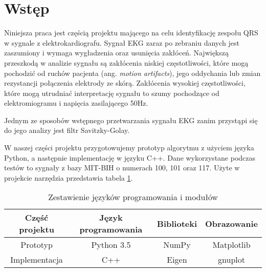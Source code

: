 \section{Wstęp}

Niniejsza praca jest częścią projektu mającego na celu identyfikację zespołu QRS w sygnale z elektrokardiografu. Sygnał EKG zaraz po zebraniu danych jest zaszumiony i wymaga wygładzenia oraz usunięcia zakłóceń. Największą przeszkodą w analizie sygnału są zakłócenia niskiej częstotliwości, które mogą pochodzić od ruchów pacjenta (ang. \textit{motion artifacts}), jego oddychania lub zmian rezystancji połączenia elektrody ze skórą. Zakłócenia wysokiej częstotliwości, które mogą utrudniać interpretację sygnału to szumy pochodzące od elektromiogramu i napięcia zasilającego 50Hz.

Jednym ze sposobów wstępnego przetwarzania sygnału EKG zanim przystąpi się do jego analizy jest filtr Savitzky-Golay.

W naszej części projektu przygotowujemy prototyp algorytmu z użyciem języka Python, a następnie implementację w języku C++. Dane wykorzystane podczas testów to sygnały z bazy MIT-BIH o numerach 100, 101 oraz 117.
Użyte w projekcie narzędzia przedstawia tabela \ref{tab:tools}.

\begin{table}[!htb]
  \centering
  \begin{tabular}{|c|c|c|c|}
  \hline
  Część projektu & Język programowania & Biblioteki & Obrazowanie \\
  \hline
  Prototyp & Python 3.5 & NumPy & Matplotlib \\
  \hline
  Implementacja & C++ & Eigen & gnuplot \\
  \hline
  \end{tabular}
  \caption{Zestawienie języków programowania i modułów}
  \label{tab:tools}
\end{table}

